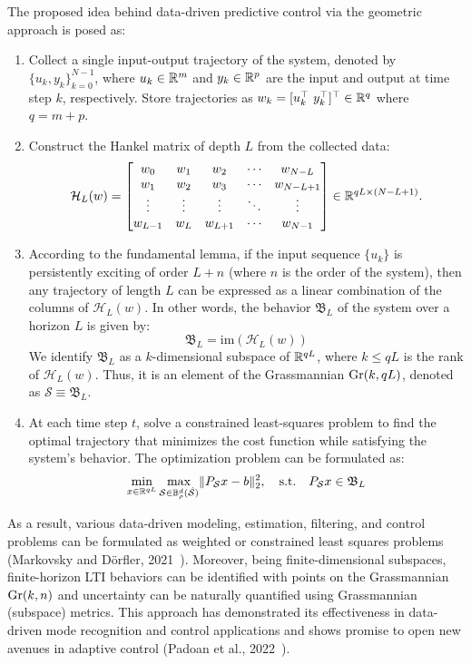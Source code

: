 The proposed idea behind data-driven predictive control via the geometric approach is posed as:
\begin{enumerate}
    \item Collect a single input-output trajectory of the system, denoted by $\{u_k, y_k\}_{k=0}^{N-1}$, where $u_k \in \mathbb{R}^m$ and $y_k \in \mathbb{R}^p$ are the input and output at time step $k$, respectively. Store trajectories as $w_k = [u_k^\top \ y_k^\top]^\top \in \mathbb{R}^{q}$ where $q = m + p$.
    \item Construct the Hankel matrix of depth $L$ from the collected data:
    \[
        \mathcal{H}_L(w) = \begin{bmatrix}
            w_0 & w_1 & w_2 & \cdots & w_{N-L} \\
            w_1 & w_2 & w_3 & \cdots & w_{N-L+1} \\
            \vdots & \vdots & \vdots & \ddots & \vdots \\
            w_{L-1} & w_L & w_{L+1} & \cdots & w_{N-1}
        \end{bmatrix} \in \mathbb{R}^{qL \times (N-L+1)}.
    \]
    \item According to the fundamental lemma, if the input sequence $\{u_k\}$ is persistently exciting of order $L + n$ (where $n$ is the order of the system), then any trajectory of length $L$ can be expressed as a linear combination of the columns of $\mathcal{H}_L(w)$. In other words, the behavior $\mathfrak{B}_L$ of the system over a horizon $L$ is given by:
    \[
        \mathfrak{B}_L = \textrm{im}(\mathcal{H}_L(w)) 
    \]
    We identify $\mathfrak{B}_L$ as a $k$-dimensional subspace of $\mathbb{R}^{qL}$, where $k \leq qL$ is the rank of $\mathcal{H}_L(w)$. Thus, it is an element of the Grassmannian $\text{Gr}(k, qL)$, denoted as $\mathcal{S} \equiv \mathfrak{B}_L$.
    \item At each time step $t$, solve a constrained least-squares problem to find the optimal trajectory that minimizes the cost function while satisfying the system's behavior. The optimization problem can be formulated as:
    \[
        \min_{x \in \mathbb{R}^{qL}} \max_{\mathcal{S} \in \mathbb{B}^d_{\rho}(\hat{\mathcal{S}})} \lVert P_{\mathcal{S}} x - b \rVert_2^2 , \quad \textrm{s.t.} \quad P_{\mathcal{S}}x \in \mathfrak{B}_L
    \]
   
\end{enumerate}

As a result, various data-driven modeling, estimation, filtering, and control problems can be formulated as weighted or constrained least squares problems (Markovsky and D\"orfler, 2021~\cite{markovsky2021}). Moreover, being finite-dimensional subspaces, finite-horizon LTI behaviors can be identified with points on the Grassmannian $\text{Gr}(k, n)$ and uncertainty can be naturally quantified using Grassmannian (subspace) metrics. This approach has demonstrated its effectiveness in data-driven mode recognition and control applications and shows promise to open new avenues in adaptive control (Padoan et al., 2022~\cite{padoan2022}).


